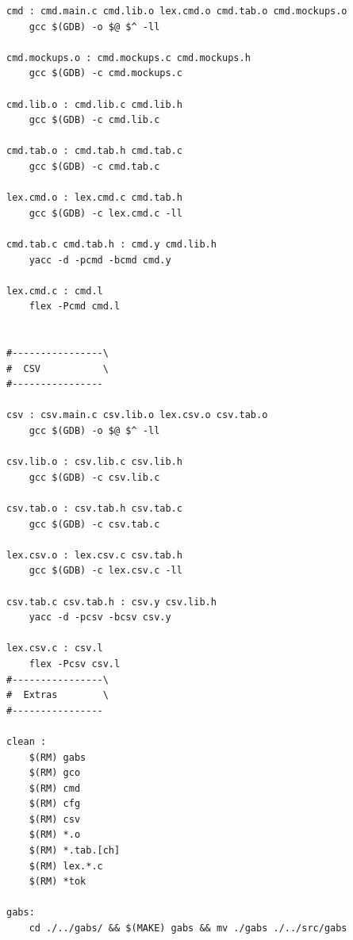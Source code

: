 \documentclass[11pt, a4paper, oneside]{article}
\begin{document}
\begin{lstlisting}[language={}, caption={Makefile}]
cmd : cmd.main.c cmd.lib.o lex.cmd.o cmd.tab.o cmd.mockups.o
	gcc $(GDB) -o $@ $^ -ll

cmd.mockups.o : cmd.mockups.c cmd.mockups.h
	gcc $(GDB) -c cmd.mockups.c

cmd.lib.o : cmd.lib.c cmd.lib.h
	gcc $(GDB) -c cmd.lib.c

cmd.tab.o : cmd.tab.h cmd.tab.c
	gcc $(GDB) -c cmd.tab.c

lex.cmd.o : lex.cmd.c cmd.tab.h
	gcc $(GDB) -c lex.cmd.c -ll

cmd.tab.c cmd.tab.h : cmd.y cmd.lib.h
	yacc -d -pcmd -bcmd cmd.y

lex.cmd.c : cmd.l
	flex -Pcmd cmd.l


#----------------\
#  CSV           \
#----------------

csv : csv.main.c csv.lib.o lex.csv.o csv.tab.o
	gcc $(GDB) -o $@ $^ -ll

csv.lib.o : csv.lib.c csv.lib.h
	gcc $(GDB) -c csv.lib.c

csv.tab.o : csv.tab.h csv.tab.c
	gcc $(GDB) -c csv.tab.c

lex.csv.o : lex.csv.c csv.tab.h
	gcc $(GDB) -c lex.csv.c -ll

csv.tab.c csv.tab.h : csv.y csv.lib.h
	yacc -d -pcsv -bcsv csv.y

lex.csv.c : csv.l
	flex -Pcsv csv.l
#----------------\
#  Extras        \
#----------------

clean :
	$(RM) gabs
	$(RM) gco
	$(RM) cmd
	$(RM) cfg
	$(RM) csv
	$(RM) *.o
	$(RM) *.tab.[ch]
	$(RM) lex.*.c
	$(RM) *tok

gabs:
	cd ./../gabs/ && $(MAKE) gabs && mv ./gabs ./../src/gabs

\end{lstlisting}
\newpage
\end{document}
